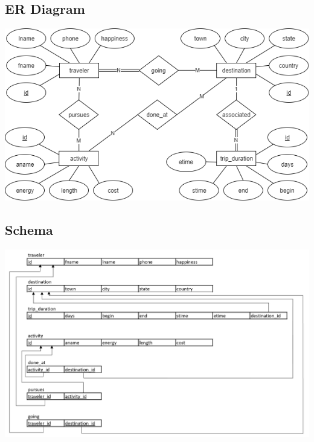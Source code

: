 \documentclass[letterpaper,10pt,onecolumn,compsoc]{IEEEtran}
\begin{document}
\newpage

\subsection{ER Diagram}


\bigskip
\includegraphics[scale=.7]{er_diagram.png}

\subsection{Schema}


\bigskip
\includegraphics[scale=.67]{schema.PNG}

\newpage

\end{document}
